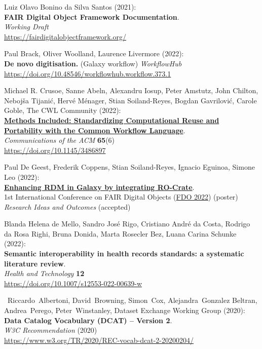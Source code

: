 \begin{thebibliography}{9}
 Luiz Olavo Bonino da Silva Santos (2021):\\
\textbf{FAIR Digital Object Framework Documentation}.\\
\emph{Working Draft}\\
\url{https://fairdigitalobjectframework.org/}

 Paul Brack, Oliver Woolland, Laurence Livermore
(2022):\\
\textbf{De novo digitisation.} (Galaxy workflow) \emph{WorkflowHub}\\
\url{https://doi.org/10.48546/workflowhub.workflow.373.1}

 Michael R. Crusoe, Sanne Abeln, Alexandru Iosup, Peter
Amstutz, John Chilton, Nebojša Tijanić, Hervé Ménager, Stian
Soiland-Reyes, Bogdan Gavrilović, Carole Goble, The CWL Community
(2022):\\
\href{../methods=included/}{\textbf{Methods Included: Standardizing
Computational Reuse and Portability with the Common Workflow
Language}}.\\
\emph{Communications of the ACM} \textbf{65}(6)\\
\url{https://doi.org/10.1145/3486897}

 Paul De Geest, Frederik Coppens, Stian
Soiland-Reyes, Ignacio Eguinoa, Simone Leo (2022):\\
\href{../galaxy-ro-crate/}{\textbf{Enhancing RDM in Galaxy by
integrating RO-Crate}}.\\
1st International Conference on FAIR Digital Objects
(\href{https://www.fdo2022.org/}{FDO 2022}) (poster)\\
\emph{Research Ideas and Outcomes} (accepted)

 Blanda Helena de Mello, Sandro José Rigo, Cristiano
André da Costa, Rodrigo da Rosa Righi, Bruna Donida, Marta Rosecler Bez,
Luana Carina Schunke (2022):\\
\textbf{Semantic interoperability in health records standards: a
systematic literature review}.\\
\emph{Health and Technology} \textbf{12}\\
\url{https://doi.org/10.1007/s12553-022-00639-w}

~Riccardo~Albertoni, David~Browning, Simon~Cox,
Alejandra~Gonzalez Beltran, Andrea~Perego, Peter~Winstanley, Dataset
Exchange Working Group (2020):\\
\textbf{Data Catalog Vocabulary (DCAT) -- Version 2}.\\
\emph{W3C Recommendation} (2020)\\
\url{https://www.w3.org/TR/2020/REC-vocab-dcat-2-20200204/}


\end{thebibliography}
